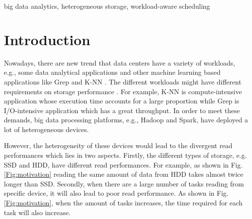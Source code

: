 \documentclass[conference]{IEEEtran}
\begin{document}
\begin{abstract}
\end{abstract}

\begin{IEEEkeywords}
big data analytics, heterogeneous storage, workload-aware scheduling
\end{IEEEkeywords}

\section{Introduction}

Nowadays, there are new trend that data centers have a variety of workloads, e.g., some data analytical applications and other machine learning based applications like Grep and K-NN \cite{b27}. The different workloads might have different requirements on storage performance \cite{b28} \cite{b29} \cite{b30} \cite{b31}. For example, K-NN is compute-intensive application whose execution time accounts for a large proportion while Grep is I/O-intensive application which has a great throughput. In order to meet these demands, big data processing platforms, e.g., Hadoop\cite{b14} and Spark\cite{b15}, have deployed a lot of heterogeneous devices.

However, the heterogeneity of these devices would lead to the divergent read performances which lies in two aspects. Firstly, the different types of storage, e.g. SSD \cite{b32} and HDD\cite{b33}, have different read performances. For example, as shown in Fig.\ref{Fig:motivation} reading the same amount of data from HDD takes almost twice longer than SSD. Secondly, when there are a large number of tasks reading from specific device, it will also lead to poor read performance. As shown in Fig.\ref{Fig:motivation}, when the amount of tasks increases, the time required for each task will also increase.
\end{document}
